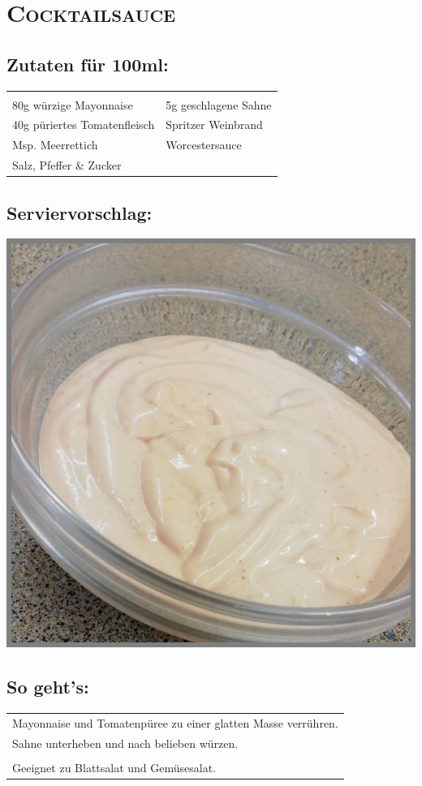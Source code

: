 \section{\textsc{Cocktailsauce}}

\subsection*{Zutaten für 100ml:}

\begin{tabular}{p{7.5cm} p{7.5cm}}
	& \\
	80g würzige Mayonnaise & 5g geschlagene Sahne\\
	40g püriertes Tomatenfleisch & Spritzer Weinbrand \\
	Msp. Meerrettich & Worcestersauce \\
	Salz, Pfeffer \& Zucker 
\end{tabular}

\subsection*{Serviervorschlag:}

\includegraphics[width=\textwidth]{img/d_cocktail.jpeg} \cite{dcocktail}

\subsection*{So geht's:}

\begin{tabular}{p{15cm}}
	\\
	Mayonnaise und Tomatenpüree zu einer glatten Masse verrühren.\\
	Sahne unterheben und nach belieben würzen.\\
	\\
	Geeignet zu Blattsalat und Gemüsesalat.
\end{tabular}

